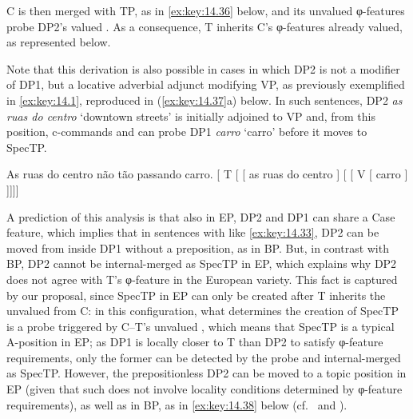 \documentclass[output=paper]{langsci/langscibook}
\begin{document}
C is then merged with TP, as in \eqref{ex:key:14.36} below, and its unvalued
φ-features probe DP2’s valued . As a consequence, T inherits C’s
φ-features already valued, as represented below.

\ea%
    \label{ex:key:14.36}
\z

Note that this derivation is also possible in cases in which DP2 is not a
modifier of DP1, but a locative adverbial adjunct modifying VP, as previously
exemplified in \eqref{ex:key:14.1}, reproduced in (\ref{ex:key:14.37}a) below.
In such sentences, DP2 \emph{as ruas do centro} ‘downtown streets’ is initially
adjoined to VP and, from this position, c-commands and can probe DP1
\emph{carro} ‘carro’ before it moves to SpecTP.\largerpage[1]

\ea%
    \label{ex:key:14.37}
	\ea     As ruas do centro não tão passando carro.
    \ex     {}[ T [ [ as ruas do centro ]
                [ [ V [ carro ] ]]]]
    \z
\z

A prediction of this analysis is that also in EP, DP2 and DP1 can share a Case
feature, which implies that in sentences with  like
\eqref{ex:key:14.33}, DP2 can be moved from inside DP1 without a preposition, as in
BP. But, in contrast with BP, DP2 cannot be internal-merged as SpecTP in EP,
which explains why DP2 does not agree with T’s φ-feature in the European
variety. This fact is captured by our proposal, since SpecTP in \gls{EP} can
only be created after T inherits the unvalued  from C\@: in this
configuration, what determines the creation of SpecTP is a probe triggered by
C--T’s unvalued , which means that SpecTP is a typical A-position in
\gls{EP}; as DP1 is locally closer to T than DP2 to satisfy φ-feature
requirements, only the former can be detected by the probe and internal-merged
as SpecTP\@.  However, the prepositionless DP2 can be moved to a topic position
in \gls{EP} (given that such  does not involve locality conditions
determined by φ-feature requirements), as well as in BP, as in \eqref{ex:key:14.38}
below (cf.\ \citealt{Costa2010} and \citealt{AvelarGalves2011}).
\end{document}
